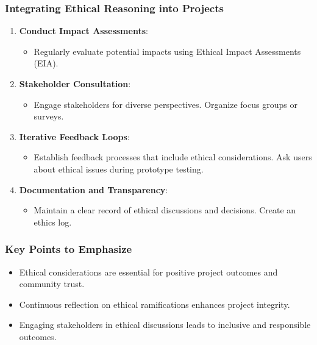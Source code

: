 \documentclass[aspectratio=169]{beamer}
\begin{document}
\begin{frame}[fragile]
    \frametitle{Integrating Ethical Reasoning into Projects}
    \begin{enumerate}
        \item \textbf{Conduct Impact Assessments}:
            \begin{itemize}
                \item Regularly evaluate potential impacts using Ethical Impact Assessments (EIA).
            \end{itemize}

        \item \textbf{Stakeholder Consultation}:
            \begin{itemize}
                \item Engage stakeholders for diverse perspectives. Organize focus groups or surveys.
            \end{itemize}
        
        \item \textbf{Iterative Feedback Loops}:
            \begin{itemize}
                \item Establish feedback processes that include ethical considerations. Ask users about ethical issues during prototype testing.
            \end{itemize}
        
        \item \textbf{Documentation and Transparency}:
            \begin{itemize}
                \item Maintain a clear record of ethical discussions and decisions. Create an ethics log.
            \end{itemize}
    \end{enumerate}
\end{frame}

\begin{frame}[fragile]
    \frametitle{Key Points to Emphasize}
    \begin{itemize}
        \item Ethical considerations are essential for positive project outcomes and community trust.
        \item Continuous reflection on ethical ramifications enhances project integrity.
        \item Engaging stakeholders in ethical discussions leads to inclusive and responsible outcomes.
    \end{itemize}
\end{frame}
\end{document}
